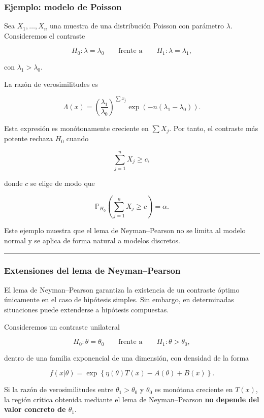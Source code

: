 \documentclass[
]{article}
\begin{document}
\subsubsection{Ejemplo: modelo de Poisson}\label{ejemplo-modelo-de-poisson}

Sea \(X_1,\dots,X_n\) una muestra de una distribución Poisson con parámetro \(\lambda\). Consideremos el contraste

\[
H_0:\lambda=\lambda_0
\qquad \text{frente a} \qquad
H_1:\lambda=\lambda_1,
\]

con \(\lambda_1>\lambda_0\).

La razón de verosimilitudes es

\[
\Lambda(x)
=\left(\frac{\lambda_1}{\lambda_0}\right)^{\sum x_j}
\exp\!\left(-n(\lambda_1-\lambda_0)\right).
\]

Esta expresión es monótonamente creciente en \(\sum X_j\). Por tanto, el contraste más potente rechaza \(H_0\) cuando

\[
\sum_{j=1}^n X_j \ge c,
\]

donde \(c\) se elige de modo que

\[
\mathbb{P}_{H_0}\!\left(\sum_{j=1}^n X_j \ge c\right)=\alpha.
\]

Este ejemplo muestra que el lema de Neyman--Pearson no se limita al modelo normal y se aplica de forma natural a modelos discretos.

\begin{center}\rule{0.5\linewidth}{0.5pt}\end{center}

\subsubsection{Extensiones del lema de Neyman--Pearson}\label{extensiones-del-lema-de-neymanpearson}

El lema de Neyman--Pearson garantiza la existencia de un contraste óptimo únicamente en el caso de hipótesis simples. Sin embargo, en determinadas situaciones puede extenderse a hipótesis compuestas.

Consideremos un contraste unilateral

\[
H_0:\theta=\theta_0
\qquad \text{frente a} \qquad
H_1:\theta>\theta_0,
\]

dentro de una familia exponencial de una dimensión, con densidad de la forma

\[
f(x|\theta)=\exp\!\left\{\eta(\theta)T(x)-A(\theta)+B(x)\right\}.
\]

Si la razón de verosimilitudes entre \(\theta_1>\theta_0\) y \(\theta_0\) es monótona creciente en \(T(x)\), la región crítica obtenida mediante el lema de Neyman--Pearson \textbf{no depende del valor concreto de \(\theta_1\)}.
\end{document}
